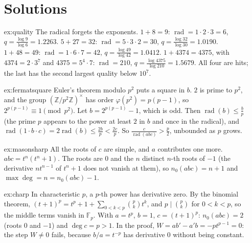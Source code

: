 \section{Solutions}

\begin{solution}{ex:quality}
\idea The radical forgets the exponents.
\writeup $1+8=9$: $\operatorname{rad}=1\cdot2\cdot3=6$, $q=\frac{\log9}{\log6}=1.2263$. $5+27=32$: $\operatorname{rad}=5\cdot3\cdot2=30$,
$q=\frac{\log32}{\log30}=1.0190$. $1+48=49$: $\operatorname{rad}=1\cdot6\cdot7=42$, $q=\frac{\log49}{\log42}=1.0412$. $1+4374=4375$, with $4374=2\cdot3^7$ and
$4375=5^4\cdot7$: $\operatorname{rad}=210$, $q=\frac{\log4375}{\log210}=1.5679$. All four are hits; the last has the second largest quality below
$10^7$.
\end{solution}

\begin{solution}{ex:fermatsquare}
\idea Euler's theorem modulo $p^2$ puts a square in $b$.
\writeup $2$ is prime to $p^2$, and the group $(\mathbb Z/p^2\mathbb Z)^\times$ has order $\varphi(p^2)=p(p-1)$, so $2^{p(p-1)}\equiv1\pmod{p^2}$. Let
$b=2^{p(p-1)}-1$, which is odd. Then $\operatorname{rad}(b)\le\frac bp$ (the prime $p$ appears to the power at least $2$ in $b$ and once in the radical),
and $\operatorname{rad}(1\cdot b\cdot c)=2\operatorname{rad}(b)\le\frac{2b}p<\frac{2c}p$. So $\frac c{\operatorname{rad}(abc)}>\frac p2$, unbounded as $p$ grows.
\end{solution}

\begin{solution}{ex:masonsharp}
\idea All the roots of $c$ are simple, and $a$ contributes one more.
\writeup $abc=t^n(t^n+1)$. The roots are $0$ and the $n$ distinct $n$-th roots of $-1$ (the derivative $nt^{n-1}$ of $t^n+1$ does not vanish at them), so
$n_0(abc)=n+1$ and $\max\deg=n=n_0(abc)-1$.
\end{solution}

\begin{solution}{ex:charp}
\idea In characteristic $p$, a $p$-th power has derivative zero.
\writeup By the binomial theorem, $(t+1)^p=t^p+1+\sum_{0<k<p}\binom pkt^k$, and $p\mid\binom pk$ for $0<k<p$, so the middle terms vanish in $\mathbb F_p$.
With $a=t^p$, $b=1$, $c=(t+1)^p$: $n_0(abc)=2$ (roots $0$ and $-1$) and $\deg c=p>1$. In the proof, $W=ab'-a'b=-pt^{p-1}=0$: the step $W\ne0$ fails,
because $b/a=t^{-p}$ has derivative $0$ without being constant.
\end{solution}

